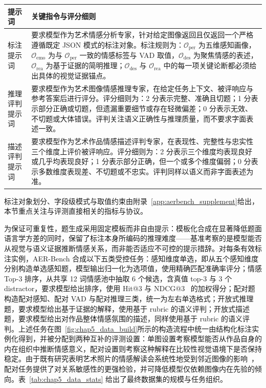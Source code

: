\begin{table}[!htbp]
    \centering
    \vspace{0.5em}\centering\wuhao
    \setlength{\tabcolsep}{5pt}
    \renewcommand{\arraystretch}{1.15}
    \begin{tabularx}{\textwidth}{@{}>{\raggedright\arraybackslash}p{}>{\raggedright\arraybackslash}X@{}}
    \toprule
    提示词 & 关键指令与评分细则 \\
    \midrule
    标注提示词 & 要求模型作为艺术情感分析专家，针对给定图像返回且仅返回一个严格遵循既定 JSON 模式的标注对象。标注规则为：$\mathcal{O}_{\text{per}}$ 为五维感知画像，$\mathcal{O}_{\text{emo}}$ 为与 $\mathcal{O}_{\text{per}}$ 一致的情感标签与 VAD 取值，$\mathcal{O}_{\text{des}}$ 为聚焦情感的表述，$\mathcal{O}_{\text{rea}}$ 为基于证据的简明推理；$\mathcal{O}_{\text{des}}$ 与 $\mathcal{O}_{\text{rea}}$ 中的每一项关键论断都必须给出具体的视觉证据锚点。 \\
    \midrule
    推理评判提示词 & 要求模型作为艺术图像情感推理专家，在给定任务上下文、被评响应与参考答案后进行评分。评分细则为：2 分表示完整、准确且切题；1 分表示部分正确或切题，但遗漏重要细节或存在轻微偏差；0 分表示无效、不切题或大体错误。评判关注语义正确性与推理质量，而不要求字面表述一致。 \\
    \midrule
    描述评判提示词 & 要求模型作为艺术作品情感描述评判专家，在表现性、完整性与忠实性三个维度上评价被评响应。评分细则为：2 分表示三个维度均表现良好或几乎均表现良好；1 分表示部分正确，但一个或多个维度偏弱；0 分表示多数维度表现差、不切题或不忠实。评判同样以语义而非字面表述为准。 \\
    \bottomrule
    \end{tabularx}
\end{table}

标注对象划分、字段级模式与取值约束由附录~\ref{app:aerbench_supplement}给出，本节重点关注与评测直接相关的指标与协议。

为保证可重复性，题生成采用固定模板而非自由提示：模板化合成在显著降低题面语言学方差的同时，保留了标注本身所编码的推理难度——基准考察的是模型能否从视觉与语义证据推断情感关系，而非能否适应不可控的提示措辞。对每条有效标注实例，AER-Bench 合成以下五类受控任务：感知维度单选，即从五个感知维度分别构造单选感知题，模型输出归一化为选项值，使用精确匹配准确率评分；情感 Top-3 排序，从共享 12 词情感池中抽取 6 个候选，含真值 top-3 与 3 个 distractor，要求模型给出排序，使用 Hit@3 与 NDCG@3~\cite{NDCG} 的加权得分；配对题构造配对感知、配对 VAD 与配对推理三类，统一为左右单选格式；开放式推理题，要求模型给出基于证据的解释，使用基于 rubric 的语义评判；开放式描述题，要求模型给出对作品整体情感氛围的描述，同样使用基于 rubric 的语义评判。上述任务在图~\ref{fig:chap5_data_build}所示的构造流程中统一由结构化标注实例化得到，并被分配到两种互补的评测设置：单图设置考察模型能否从作品自身的内在组织中推断情感意义，配对设置则考察这种解释在比较性视觉语境下是否保持稳定。由于既有研究表明艺术照片的情感解读会系统性地受到邻近图像的影响~\cite{reymond2025pictorial}，配对任务提供了对关系敏感性的更强检验，并可降低模型仅依赖图像内在先验的倾向。表~\ref{tab:chap5_data_stats} 给出了最终数据集的规模与任务组织。

